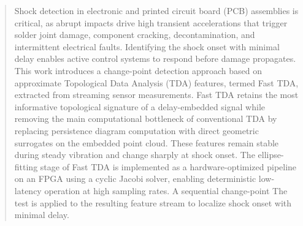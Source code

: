 \documentclass[colorlinks,upint,subscriptcorrection,varvw,hyphenate,balance,greek,russian,vietnamese,german]{asmeconf} %
\begin{document}

\maketitle






\begin{abstract}
Shock detection in electronic and printed circuit board (PCB) assemblies is critical, as abrupt impacts drive high transient accelerations that trigger solder joint damage, component cracking, decontamination, and intermittent electrical faults. Identifying the shock onset with minimal delay enables active control systems to respond before damage propagates. This work introduces a change-point detection approach based on approximate Topological Data Analysis (TDA) features, termed Fast TDA, extracted from streaming sensor measurements. Fast TDA retains the most informative topological signature of a delay-embedded signal while removing the main computational bottleneck of conventional TDA by replacing persistence diagram computation with direct geometric surrogates on the embedded point cloud. These features remain stable during steady vibration and change sharply at shock onset. The ellipse-fitting stage of Fast TDA is implemented as a hardware-optimized pipeline on an FPGA using a cyclic Jacobi solver, enabling deterministic low-latency operation at high sampling rates. A sequential change-point The test is applied to the resulting feature stream to localize shock onset with minimal delay.
\end{abstract}
\end{document}
